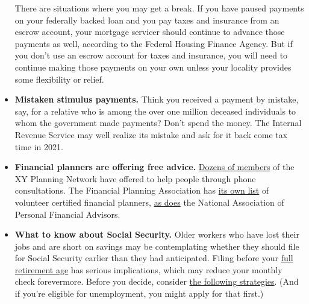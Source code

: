 \begin{itemize}
  There are situations where you may get a break. If you have paused
  payments on your federally backed loan and you pay taxes and insurance
  from an escrow account, your mortgage servicer should continue to
  advance those payments as well, according to the Federal Housing
  Finance Agency. But if you don't use an escrow account for taxes and
  insurance, you will need to continue making those payments on your own
  unless your locality provides some flexibility or relief.
\item
  \textbf{Mistaken stimulus payments.} Think you received a payment by
  mistake, say, for a relative who is among the over one million
  deceased individuals to whom the government made payments? Don't spend
  the money. The Internal Revenue Service may well realize its mistake
  and ask for it back come tax time in 2021.
\item
  \textbf{Financial planners are offering free advice.}
  \href{https://www.xyplanningnetwork.com/?_advisor_search=\%22coronavirus\%20relief\%22}{Dozens
  of members} of the XY Planning Network have offered to help people
  through phone consultations. The Financial Planning Association has
  \href{https://www.onefpa.org/Pages/ProBonoPlanning.aspx}{its own list}
  of volunteer certified financial planners,
  \href{https://www.napfa.org/find-an-advisor}{as does} the National
  Association of Personal Financial Advisors.
\item
  \textbf{What to know about Social Security.} Older workers who have
  lost their jobs and are short on savings may be contemplating whether
  they should file for Social Security earlier than they had
  anticipated. Filing before your
  \href{https://www.ssa.gov/planners/retire/retirechart.html}{full
  retirement age} has serious implications, which may reduce your
  monthly check forevermore. Before you decide, consider
  \href{https://www.nytimes3xbfgragh.onion/2020/04/17/business/retiring-social-security-jobs-coronavirus-pandemic.html}{the
  following strategies}. (And if you're eligible for unemployment, you
  might apply for that first.)


\end{itemize}
